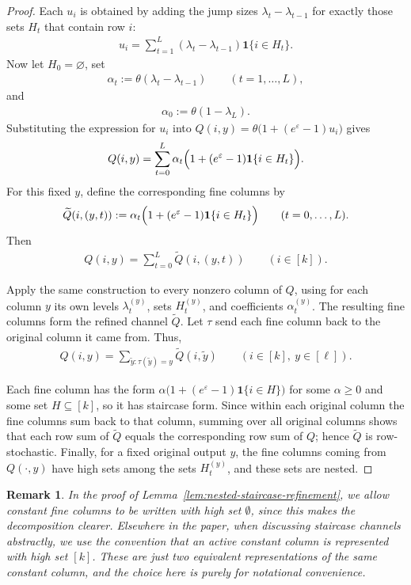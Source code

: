 \documentclass{article}
\theoremstyle{plain}
\newtheorem{remark}[theorem]{Remark}
\theoremstyle{definition}
\theoremstyle{plain}
\begin{document}
\begin{proof}
Each $u_i$ is obtained by adding the jump sizes $\lambda_t-\lambda_{t-1}$ for exactly those sets $H_t$ that contain row $i$:
\begin{align*}
    u_i=\sum_{t=1}^L (\lambda_t-\lambda_{t-1})\mathbf 1\{i\in H_t\}.
\end{align*}
Now let $H_0=\varnothing$, set
\begin{align*}
    \alpha_t:=\theta(\lambda_t-\lambda_{t-1}) \qquad (t=1,\dots,L),
\end{align*}
and
\begin{align*}
    \alpha_0:=\theta(1-\lambda_L).
\end{align*}
Substituting the expression for $u_i$ into
$Q(i,y)=\theta\bigl(1+(e^\varepsilon-1)u_i\bigr)$ gives
\begin{align*}
    Q(i,y)=\sum_{t=0}^L \alpha_t\Bigl(1+(e^\varepsilon-1)\mathbf 1\{i\in H_t\}\Bigr).
\end{align*}
For this fixed $y$, define the corresponding fine columns by
\begin{align*}
    \widetilde Q(i,(y,t))
    :=\alpha_t\Bigl(1+(e^\varepsilon-1)\mathbf 1\{i\in H_t\}\Bigr)
    \qquad (t=0,\dots,L).
\end{align*}
Then
\begin{align*}
    Q(i,y)=\sum_{t=0}^L \widetilde Q(i,(y,t))
    \qquad (i\in[k]).
\end{align*}

Apply the same construction to every nonzero column of $Q$, using for each column $y$ its own levels $\lambda_t^{(y)}$, sets $H_t^{(y)}$, and coefficients $\alpha_t^{(y)}$.
The resulting fine columns form the refined channel $\widetilde Q$.
Let $\tau$ send each fine column back to the original column it came from.
Thus,
\begin{align*}
    Q(i,y)=\sum_{\tilde y:\tau(\tilde y)=y}\widetilde Q(i,\tilde y) \qquad (i\in[k],\ y\in[\ell]).
\end{align*}

Each fine column has the form $\alpha\bigl(1+(e^\varepsilon-1)\mathbf 1\{i\in H\}\bigr)$ for some $\alpha\ge 0$ and some set $H\subseteq[k]$, so it has staircase form.
Since within each original column the fine columns sum back to that column, summing over all original columns shows that each row sum of $\widetilde Q$ equals the corresponding row sum of $Q$; hence $\widetilde Q$ is row-stochastic. Finally, for a fixed original output $y$, the fine columns coming from $Q(\cdot,y)$ have high sets among the sets $H_t^{(y)}$, and these sets are nested.
\end{proof}
\begin{remark}
In the proof of Lemma~\ref{lem:nested-staircase-refinement}, we allow constant fine columns to be written with high set $\emptyset$, since this makes the decomposition clearer.
Elsewhere in the paper, when discussing staircase channels abstractly, we use the convention that an active constant column is represented with high set $[k]$. These are just two equivalent representations of the same constant column, and the choice here is purely for notational convenience.
\end{remark}
\end{document}
